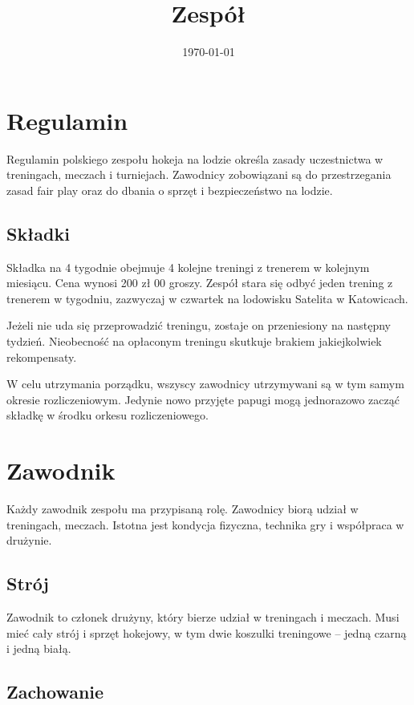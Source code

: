 \documentclass{article}
\title{Zespół}
\date{\today}
\begin{document}
\maketitle

\section{Regulamin}

Regulamin polskiego zespołu hokeja na lodzie określa zasady uczestnictwa w treningach, meczach i turniejach. Zawodnicy zobowiązani są do przestrzegania zasad fair play oraz do dbania o sprzęt i bezpieczeństwo na lodzie.

\subsection{Składki}

Składka na 4 tygodnie obejmuje 4 kolejne treningi z trenerem w kolejnym miesiącu. Cena wynosi 200 zł 00 groszy. Zespół stara się odbyć jeden trening z trenerem w tygodniu, zazwyczaj w czwartek na lodowisku Satelita w Katowicach.  

Jeżeli nie uda się przeprowadzić treningu, zostaje on przeniesiony na następny tydzień. Nieobecność na opłaconym treningu skutkuje brakiem jakiejkolwiek rekompensaty.  

W celu utrzymania porządku, wszyscy zawodnicy utrzymywani są w tym samym okresie rozliczeniowym. Jedynie nowo przyjęte papugi mogą jednorazowo zacząć składkę w środku orkesu rozliczeniowego.

\section{Zawodnik}

Każdy zawodnik zespołu ma przypisaną rolę. Zawodnicy biorą udział w treningach, meczach. Istotna jest kondycja fizyczna, technika gry i współpraca w drużynie.

\subsection{Strój}

Zawodnik to członek drużyny, który bierze udział w treningach i meczach. Musi mieć cały strój i sprzęt hokejowy, w tym dwie koszulki treningowe – jedną czarną i jedną białą.  


\subsection{Zachowanie}
\end{document}
